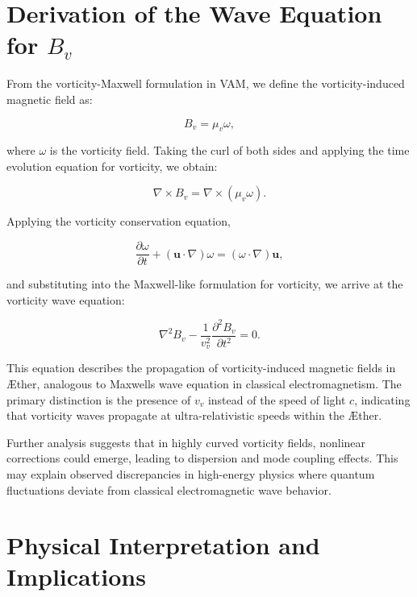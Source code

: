 \section{Derivation of the Wave Equation for $B_v$}

From the vorticity-Maxwell formulation in VAM, we define the vorticity-induced magnetic field as:

\begin{equation*}
    B_v = \mu_v \omega,
\end{equation*}

where $\omega$ is the vorticity field. Taking the curl of both sides and applying the time evolution equation for vorticity, we obtain:

\begin{equation*}
    \nabla \times B_v = \nabla \times (\mu_v \omega).
\end{equation*}

Applying the vorticity conservation equation,

\begin{equation*}
    \frac{\partial \omega}{\partial t} + (\boldsymbol{u} \cdot \nabla) \omega = (\omega \cdot \nabla) \boldsymbol{u},
\end{equation*}

and substituting into the Maxwell-like formulation for vorticity, we arrive at the vorticity wave equation:

\begin{equation*}
    \nabla^2 B_v - \frac{1}{v_v^2} \frac{\partial^2 B_v}{
        \partial t^2} = 0.
\end{equation*}

This equation describes the propagation of vorticity-induced magnetic fields in Æther, analogous to Maxwell\rqs s wave equation in classical electromagnetism. The primary distinction is the presence of $v_v$ instead of the speed of light $c$, indicating that vorticity waves propagate at ultra-relativistic speeds within the Æther.

Further analysis suggests that in highly curved vorticity fields, nonlinear corrections could emerge, leading to dispersion and mode coupling effects. This may explain observed discrepancies in high-energy physics where quantum fluctuations deviate from classical electromagnetic wave behavior.

\section{Physical Interpretation and Implications}

